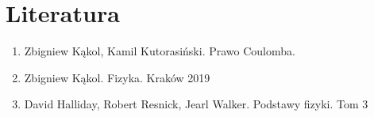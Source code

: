 \documentclass{article}
\begin{document}
\section{Literatura}
\begin{enumerate}
    \item Zbigniew Kąkol, Kamil Kutorasiński. Prawo Coulomba. 
    \item Zbigniew Kąkol. Fizyka. Kraków 2019
    \item David Halliday, Robert Resnick, Jearl Walker. Podstawy fizyki. Tom 3
\end{enumerate}
\end{document}
